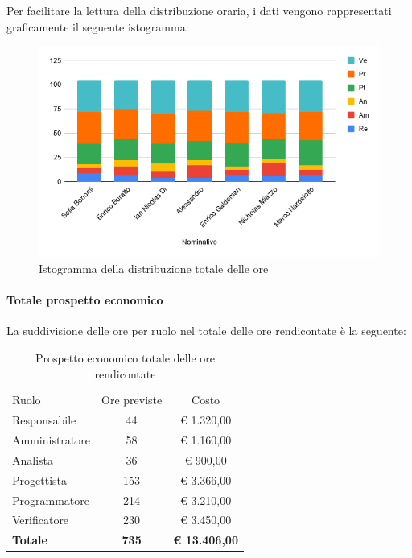 \documentclass[../piano-di-progetto.tex]{subfiles}
\begin{document}
      Per facilitare la lettura della distribuzione oraria, i dati vengono rappresentati graficamente il seguente istogramma:
      \begin{figure}[H]
        \centering
        \includegraphics[width=12cm]{img/ore-rendicontate.png}
        \caption{Istogramma della distribuzione totale delle ore}
        \label{fig:ore-rendicontate}
      \end{figure}
  
      \paragraph{Totale prospetto economico}
      La suddivisione delle ore per ruolo nel totale delle ore rendicontate è la seguente:
      \begin{table}[H]
        \centering
        \begin{tabular}{lcc}
          Ruolo           & Ore previste & Costo                \\
          Responsabile    & 44           & € 1.320,00           \\
          Amministratore  & 58           & € 1.160,00           \\
          Analista        & 36           & € 900,00             \\
          Progettista     & 153          & € 3.366,00           \\
          Programmatore   & 214          & € 3.210,00           \\
          Verificatore    & 230          & € 3.450,00           \\
          \textbf{Totale} & \textbf{735} & \textbf{€ 13.406,00}
        \end{tabular}
        \caption{Prospetto economico totale delle ore rendicontate}
      \end{table}
  
\end{document}
